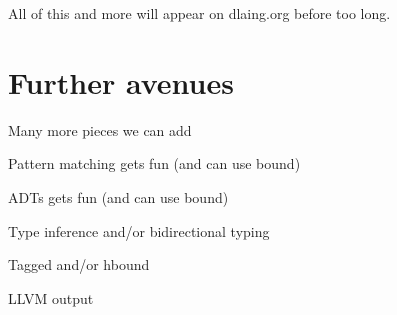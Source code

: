 \documentclass[aspectration=169]{beamer}
\begin{document}
\begin{frame}[c]
All of this and more will appear on dlaing.org before too long. 
\end{frame}

\section{Further avenues}

\begin{frame}[c]
Many more pieces we can add
\end{frame}

\begin{frame}[c]
Pattern matching gets fun (and can use bound)
\end{frame}

\begin{frame}[c]
ADTs gets fun (and can use bound)
\end{frame}

\begin{frame}[c]
Type inference and/or bidirectional typing
\end{frame}

\begin{frame}[c]
Tagged and/or hbound
\end{frame}

\begin{frame}[c]
LLVM output
\end{frame}
\end{document}
